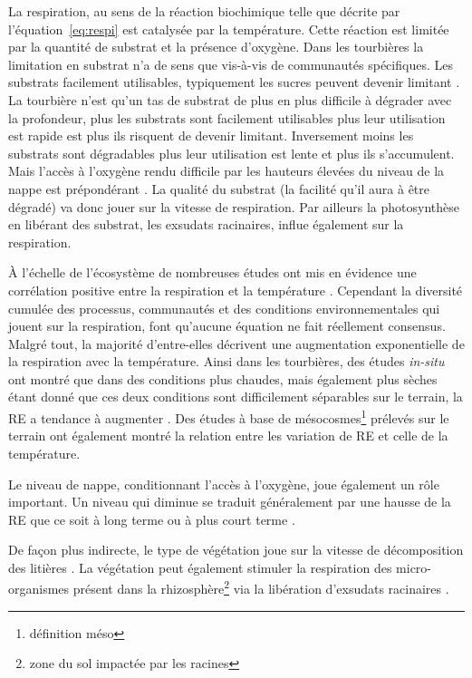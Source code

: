 La respiration, au sens de la réaction biochimique telle que  décrite par l'équation~\ref{eq:respi} est catalysée par la température.
Cette réaction est limitée par la quantité de substrat et la présence d'oxygène.
Dans les tourbières la limitation en substrat n'a de sens que vis-à-vis de communautés spécifiques.
Les substrats facilement utilisables, typiquement les sucres peuvent devenir limitant \plop.
La tourbière n'est qu'un tas de substrat de plus en plus difficile à dégrader avec la profondeur, plus les substrats sont facilement utilisables plus leur utilisation est rapide est plus ils risquent de devenir limitant.
Inversement moins les substrats sont dégradables plus leur utilisation est lente et plus ils s'accumulent.
Mais l'accès à l'oxygène rendu difficile par les hauteurs élevées du niveau de la nappe est prépondérant \plop.
La qualité du substrat (la facilité qu'il aura à être dégradé) va donc jouer sur la vitesse de respiration.
Par ailleurs la photosynthèse en libérant des substrat, les exsudats racinaires, influe également sur la respiration.

À l'échelle de l'écosystème de nombreuses études ont mis en évidence une corrélation positive entre la respiration et la température \citep{singh1977,raich1992,luo2006}.
Cependant la diversité cumulée des processus, communautés et des conditions environnementales qui jouent sur la respiration, font qu'aucune équation ne fait réellement consensus.
Malgré tout, la majorité d'entre-elles décrivent une augmentation exponentielle de la respiration avec la température.
Ainsi dans les tourbières, des études \textit{in-situ} ont montré que dans des conditions plus chaudes, mais également plus sèches étant donné que ces deux conditions sont difficilement séparables sur le terrain, la RE a tendance à augmenter  \citep{aurela2007,cai2010,ward2013}.
Des études à base de mésocosmes\footnote{définition méso} prélevés sur le terrain ont également montré la relation entre les variation de RE et celle de la température\citep{updegraff2001,weedon2013}.

Le niveau de nappe, conditionnant l'accès à l'oxygène, joue également un rôle important.
Un niveau qui diminue se traduit généralement par une hausse de la RE que ce soit à long terme \citep{strack2006,ballantyne2014} ou à plus court terme \citep{aerts1997}.

De façon plus indirecte, le type de végétation joue sur la vitesse de décomposition des litières \citep{hobbie1996,liu2000}.
La végétation peut également stimuler la respiration des micro-organismes présent dans la rhizosphère\footnote{zone du sol impactée par les racines} via la libération d'exsudats racinaires \citep{moore2002}.

